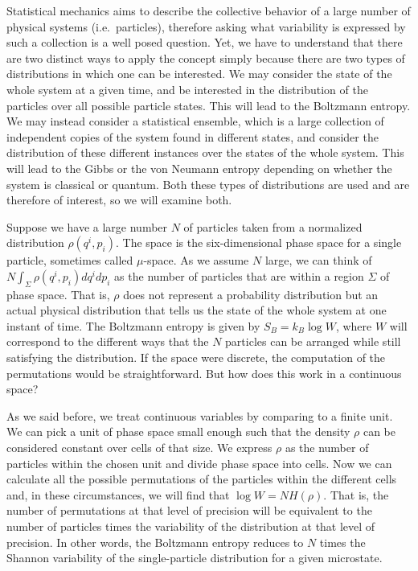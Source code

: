 \documentclass[prb, twocolumn]{revtex4-1}
\begin{document}
Statistical mechanics aims to describe the collective behavior of a large number of physical systems (i.e.~particles), therefore asking what variability is expressed by such a collection is a well posed question. Yet, we have to understand that there are two distinct ways to apply the concept simply because there are two types of distributions in which one can be interested. We may consider the state of the whole system at a given time, and be interested in the distribution of the particles over all possible particle states. This will lead to the Boltzmann entropy. We may instead consider a statistical ensemble, which is a large collection of independent copies of the system found in different states, and consider the distribution of these different instances over the states of the whole system. This will lead to the Gibbs or the von Neumann entropy depending on whether the system is classical or quantum. Both these types of distributions are used and are therefore of interest, so we will examine both.

Suppose we have a large number $N$ of particles taken from a normalized distribution $\rho(q^i, p_i)$. The space is the six-dimensional phase space for a single particle, sometimes called $\mu$-space. As we assume $N$ large, we can think of $N\int_\Sigma \rho(q^i, p_i)dq^idp_i$ as the number of particles that are within a region $\Sigma$ of phase space. That is, $\rho$ does not represent a probability distribution but an actual physical distribution that tells us the state of the whole system at one instant of time. The Boltzmann entropy is given by $S_B = k_B \log W$, where $W$ will correspond to the different ways that the $N$ particles can be arranged while still satisfying the distribution. If the space were discrete, the computation of the permutations would be straightforward. But how does this work in a continuous space?

As we said before, we treat continuous variables by comparing to a finite unit. We can pick a unit of phase space small enough such that the density $\rho$ can be considered constant over cells of that size. We express $\rho$ as the number of particles within the chosen unit and divide phase space into cells. Now we can calculate all the possible permutations of the particles within the different cells and, in these circumstances, we will find that $\log W = N H(\rho)$. That is, the number of permutations at that level of precision will be equivalent to the number of particles times the variability of the distribution at that level of precision. In other words, the Boltzmann entropy reduces to $N$ times the Shannon variability of the single-particle distribution for a given microstate.
\end{document}
